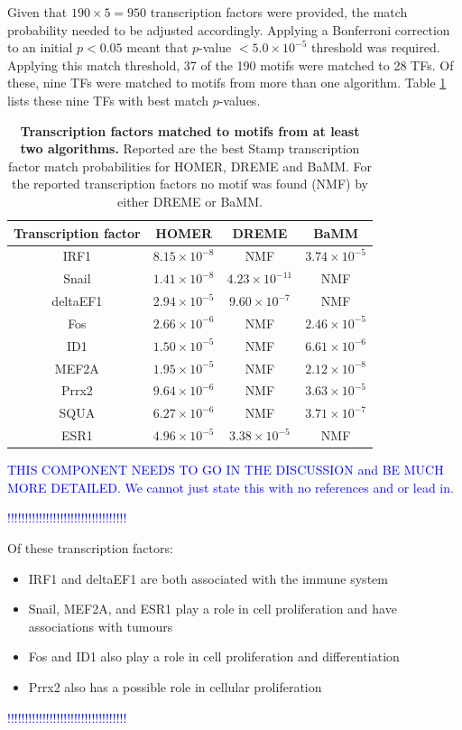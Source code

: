 \documentclass[12pt]{article}
\begin{document}
Given that $190 \times 5 = 950$ transcription factors were provided, the match probability needed to be adjusted accordingly. Applying a Bonferroni correction to an initial $p < 0.05$ meant that $p$-value $< 5.0\times10^{-5}$ threshold was required. Applying this match threshold, 37 of the 190 motifs were matched to 28 TFs. Of these, nine TFs were matched to motifs from more than one algorithm.
Table \ref{tfsWithMotifs} lists these nine TFs with best match $p$-values.

\begin{table}[!htbp]
\caption{{\bf Transcription factors matched to motifs from at least two algorithms.} Reported are the best Stamp transcription factor match probabilities for 
              HOMER, DREME and BaMM. For the reported transcription factors no motif was found (NMF) by either DREME or BaMM.}
\label{tfsWithMotifs}
\centering
\begin{tabular}{cccc}
\toprule[0.2em]
Transcription factor & HOMER & DREME & BaMM\\
\midrule[0.1em]
IRF1             & $8.15\times10^{-8}$ & NMF & $3.74\times10^{-5}$\\
Snail             & $1.41\times10^{-8}$ & $4.23\times10^{-11}$ & NMF\\
deltaEF1      & $2.94\times10^{-5}$ & $9.60\times10^{-7}$ & NMF\\
Fos              & $2.66\times10^{-6}$ & NMF & $2.46\times10^{-5}$\\
ID1              & $1.50\times10^{-5}$ & NMF & $6.61\times10^{-6}$\\
MEF2A        & $1.95\times10^{-5}$ & NMF & $2.12\times10^{-8}$\\
Prrx2           & $9.64\times10^{-6}$ & NMF & $3.63\times10^{-5}$\\
SQUA         & $6.27\times10^{-6}$ & NMF  &$ 3.71\times10^{-7}$\\
ESR1         & $4.96\times10^{-5}$ & $3.38\times10^{-5}$ & NMF\\
\bottomrule[0.2em]
\end{tabular}
\end{table}

\textcolor{blue}{THIS COMPONENT NEEDS TO GO IN THE DISCUSSION and BE MUCH MORE DETAILED. We cannot just state this with no
references and or lead in.}

\textcolor{blue}{!!!!!!!!!!!!!!!!!!!!!!!!!!!!!!!!!!}

Of these transcription factors:
\begin{itemize}
\item IRF1 and deltaEF1 are both associated with the immune system
\item Snail, MEF2A, and ESR1 play a role in cell proliferation and have associations with tumours
\item Fos and ID1 also play a role in cell proliferation and  differentiation
\item Prrx2 also has a possible role in cellular proliferation
\end{itemize} 
\textcolor{blue}{!!!!!!!!!!!!!!!!!!!!!!!!!!!!!!!!!!}
\end{document}

